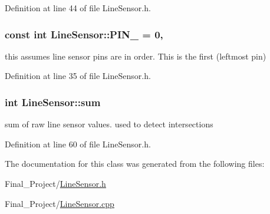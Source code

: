 Definition at line 44 of file Line\-Sensor.\-h.

\hypertarget{classLineSensor_a873c5b45cdfa14ff468db018e1e0055a}{
\subsubsection[{P\-I\-N\-\_\-0}]{\setlength{\rightskip}{0pt plus 5cm}const int Line\-Sensor\-::\-P\-I\-N\-\_ = 0\hspace{0.3cm}{\ttfamily [static]}, {\ttfamily [private]}}}\label{classLineSensor_a873c5b45cdfa14ff468db018e1e0055a}
this assumes line sensor pins are in order. This is the first (leftmost pin) 

Definition at line 35 of file Line\-Sensor.\-h.

\hypertarget{classLineSensor_af574319adc88f5949f03239b2bcbc222}{
\subsubsection[{sum}]{\setlength{\rightskip}{0pt plus 5cm}int Line\-Sensor\-::sum\hspace{0.3cm}{\ttfamily [private]}}}\label{classLineSensor_af574319adc88f5949f03239b2bcbc222}


sum of raw line sensor values. used to detect intersections 



Definition at line 60 of file Line\-Sensor.\-h.



The documentation for this class was generated from the following files\-:\begin{DoxyCompactItemize}
\item 
Final\-\_\-\-Project/\hyperlink{LineSensor_8h}{Line\-Sensor.\-h}\item 
Final\-\_\-\-Project/\hyperlink{LineSensor_8cpp}{Line\-Sensor.\-cpp}\end{DoxyCompactItemize}
